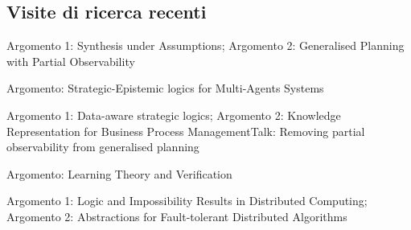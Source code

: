 \documentclass[10pt,a4paper,sans]{moderncv}
\begin{document}
\subsection{Visite di ricerca recenti}


{Argomento 1: Synthesis under Assumptions;
Argomento 2: Generalised Planning with Partial Observability}{}{}{}


{Argomento: Strategic-Epistemic logics for Multi-Agents Systems}{}{}{}

% 
{Argomento 1: Data-aware strategic logics;
Argomento 2: Knowledge Representation for Business Process Management}{Talk: 
Removing partial observability from generalised planning}{}{}


{Argomento: Learning Theory and Verification}{}{}{}


{Argomento 1: Logic and Impossibility Results in Distributed Computing;
Argomento 2: Abstractions for Fault-tolerant Distributed Algorithms}{}{}{}

% 
% 
% 
% 
% 
% 
% 
\end{document}
